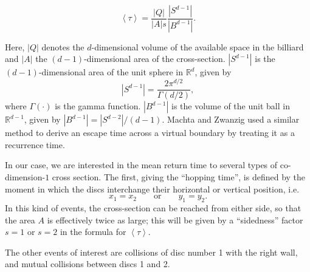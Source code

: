 \documentclass[superscriptaddress,pre,reprint,showpacs,onecolumn]{revtex4-1}
\newcommand{\mean}[1]{\left \langle #1 \right \rangle}
\newcommand{\RR}{\mathbb{R}}
\newcommand{\vv}{\mathbf{v}}
\begin{document}
\begin{equation}\label{meanfreetime}
 \mean{\tau} = \frac{|Q|}{|A|s} \frac{|S^{d-1}|} {|B^{d-1}|}.
\end{equation}


Here, $|Q|$ denotes the $d$-dimensional volume of the available 
space in the billiard and 
$|A|$ the $(d-1)$-dimensional area of the cross-section.
 $|S^{d-1}|$ is the $(d-1)$-dimensional area of the unit sphere in $\RR^d$, given by
\begin{equation}
  |S^{d-1}| = \frac{2 \pi^{d/2}}{\Gamma(d/2)},
\end{equation}
where $\Gamma(\cdot)$ is the gamma function. 
$|B^{d-1}|$ is the volume of the unit ball 
in $\RR^{d-1}$, given by $|B^{d-1}| = |S^{d-2}| / (d-1)$.
Machta and Zwanzig \cite{MachtaZwan} used a similar method to derive an escape 
time across a virtual boundary by treating it as a recurrence time.

In our case, we are interested in the mean return time to 
several types of co-dimension-$1$ cross section.
The first, giving the ``hopping time'', 
is defined by the moment
in which the discs interchange their horizontal or vertical position, i.e.
\begin{equation} \label{condchoque}
x_1 = x_2  \qquad \text{or} \qquad y_1 = y_2.
\end{equation}
In this kind of events, the cross-section can be reached from either side, so that the area
$A$ is effectively twice as large; this will be given by a ``sidedness'' factor $s = 1$ or $s=2$ in the formula
for $\mean{\tau}$.

The other events of interest are collisions of disc number 1 with the right wall, and mutual
collisions between discs 1 and 2.
%
\end{document}
